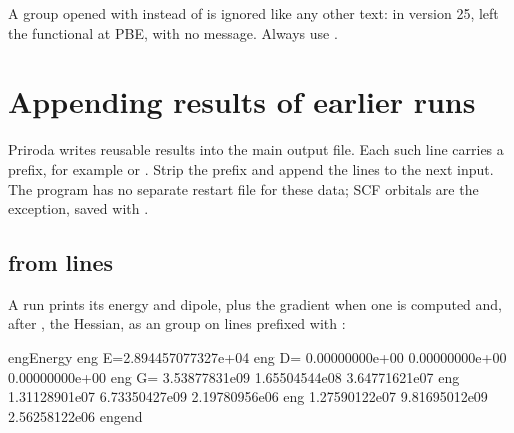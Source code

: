 \documentclass[letterpaper,10pt,english,openany,oneside]{sphinxmanual}
\begin{document}
\sphinxAtStartPar
A group opened with \sphinxcode{\sphinxupquote{\&}} instead of \sphinxcode{\sphinxupquote{\$}} is ignored like any other text: in version 25,  left the
functional at PBE, with no message. Always use \sphinxcode{\sphinxupquote{\$}}.




\section{Appending results of earlier runs}
\label{\detokenize{start/input-syntax:appending-results-of-earlier-runs}}
\sphinxAtStartPar
Priroda writes reusable results into the main output file. Each such line carries a prefix, for
example  or . Strip the prefix and append the lines to the next input. The program has no separate
restart file for these data; SCF orbitals are the exception, saved with {\hyperref[\detokenize{reference/control:control-save}]{}}.




\subsection{ from  lines}
\label{\detokenize{start/input-syntax:energy-from-eng-lines}}
\sphinxAtStartPar
A run prints its energy and dipole, plus the gradient when one is computed and, after , the Hessian, as
an {\hyperref[\detokenize{reference/Energy:group-energy}]{}} group on lines prefixed with :

\begin{sphinxVerbatim}[commandchars=\\\{\}]
eng\PYGZgt{}\PYGZdl{}Energy
eng\PYGZgt{} E=\PYGZhy{}2.894457077327e+04
eng\PYGZgt{} D= 0.00000000e+00  0.00000000e+00  0.00000000e+00
eng\PYGZgt{} G= 3.53877831e\PYGZhy{}09  1.65504544e\PYGZhy{}08 \PYGZhy{}3.64771621e\PYGZhy{}07
eng\PYGZgt{}   \PYGZhy{}1.31128901e\PYGZhy{}07 \PYGZhy{}6.73350427e\PYGZhy{}09 \PYGZhy{}2.19780956e\PYGZhy{}06
eng\PYGZgt{}    1.27590122e\PYGZhy{}07 \PYGZhy{}9.81695012e\PYGZhy{}09  2.56258122e\PYGZhy{}06
eng\PYGZgt{}\PYGZdl{}end
\end{sphinxVerbatim}
\end{document}
